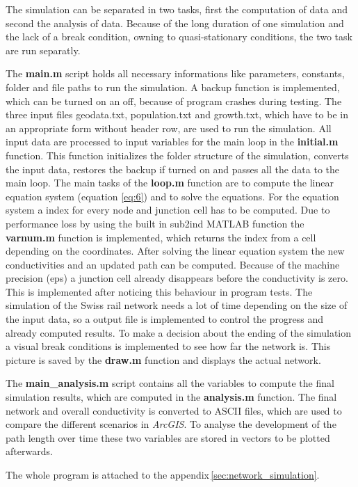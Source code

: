 \documentclass[11pt]{scrartcl}
\begin{document}
The simulation can be separated in two tasks, first the computation of data and second the analysis of data. Because of the long duration of one simulation and the lack of a break condition, owning to quasi-stationary conditions, the two task are run separatly.

The \textbf{main.m} script holds all necessary informations like parameters, constants, folder and file paths to run the simulation. A backup function is implemented, which can be turned on an off, because of program crashes during testing. The three input files geodata.txt, population.txt and growth.txt, which have to be in an appropriate form without header row, are used to run the simulation. All input data are processed to input variables for the main loop in the \textbf{initial.m} function. This function initializes the folder structure of the simulation, converts the input data, restores the backup if turned on and passes all the data to the main loop. The main tasks of the \textbf{loop.m} function are to compute the linear equation system (equation \ref{eq:6}) and to solve the equations. For the equation system a index for every node and junction cell has to be computed. Due to performance loss by using the built in sub2ind MATLAB function the \textbf{varnum.m} function is implemented, which returns the index from a cell depending on the coordinates. After solving the linear equation system the new conductivities and an updated path can be computed. Because of the machine precision (eps) a junction cell already disappears before the conductivity is zero. This is implemented after noticing this behaviour in program tests. The simulation of the Swiss rail network needs a lot of time depending on the size of the input data, so a output file is implemented to control the progress and already computed results. To make a decision about the ending of the simulation a visual break conditions is implemented to see how far the network is. This picture is saved by the \textbf{draw.m} function and displays the actual network.

The \textbf{main\_analysis.m} script contains all the variables to compute the final simulation results, which are computed in the \textbf{analysis.m} function. The final network and overall conductivity is converted to ASCII files, which are used to compare the different scenarios in \textit{ArcGIS}. To analyse the development of the path length over time these two variables are stored in vectors to be plotted afterwards.

The whole program is attached to the appendix\,\ref{sec:network_simulation}.
\end{document}
